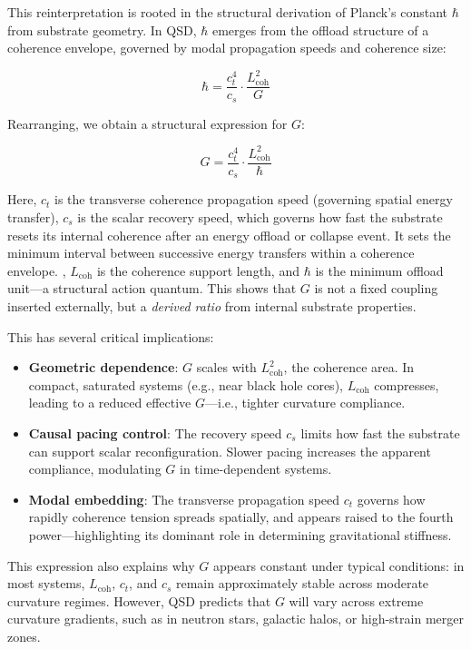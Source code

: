 \documentclass[entropy,article,submit,pdftex,moreauthors]{Definitions/mdpi}
\begin{document}
This reinterpretation is rooted in the structural derivation of Planck’s constant $\hbar$ from substrate geometry. In QSD, $\hbar$ emerges from the offload structure of a coherence envelope, governed by modal propagation speeds and coherence size:

\begin{equation}
\hbar = \frac{c_t^4}{c_s} \cdot \frac{L_{\text{coh}}^2}{G}
\end{equation}

Rearranging, we obtain a structural expression for $G$:

\begin{equation}
G = \frac{c_t^4}{c_s} \cdot \frac{L_{\text{coh}}^2}{\hbar}
\end{equation}

Here, $c_t$ is the transverse coherence propagation speed (governing spatial energy transfer), $c_s$ is the scalar recovery speed, which governs how fast the substrate resets its internal coherence after an energy offload or collapse event. It sets the minimum interval between successive energy transfers within a coherence envelope.
, $L_{\text{coh}}$ is the coherence support length, and $\hbar$ is the minimum offload unit—a structural action quantum. This shows that $G$ is not a fixed coupling inserted externally, but a \textit{derived ratio} from internal substrate properties.

\medskip
This has several critical implications:

\begin{itemize}
  \item \textbf{Geometric dependence}: $G$ scales with $L_{\text{coh}}^2$, the coherence area. In compact, saturated systems (e.g., near black hole cores), $L_{\text{coh}}$ compresses, leading to a reduced effective $G$—i.e., tighter curvature compliance.
  \item \textbf{Causal pacing control}: The recovery speed $c_s$ limits how fast the substrate can support scalar reconfiguration. Slower pacing increases the apparent compliance, modulating $G$ in time-dependent systems.
  \item \textbf{Modal embedding}: The transverse propagation speed $c_t$ governs how rapidly coherence tension spreads spatially, and appears raised to the fourth power—highlighting its dominant role in determining gravitational stiffness.
\end{itemize}

This expression also explains why $G$ appears constant under typical conditions: in most systems, $L_{\text{coh}}$, $c_t$, and $c_s$ remain approximately stable across moderate curvature regimes. However, QSD predicts that $G$ will vary across extreme curvature gradients, such as in neutron stars, galactic halos, or high-strain merger zones.
\end{document}
